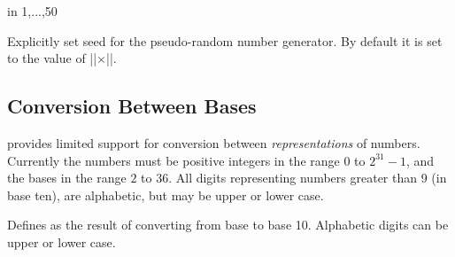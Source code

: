 \begin{codeexample}[]
\begin{pgfpicture}
   \foreach \a in {1,...,50}{
      \color{\c!40!white}
   }	  
\end{pgfpicture}
\end{codeexample}

\begin{command}{\pgfmathsetseed{}}
  Explicitly set seed for the pseudo-random number generator. By
  default it is set to the value of |\time|$\times$|\year|.
\end{command}


      
\subsection{Conversion Between Bases}
	
\label{pgfmath-bases}

\pgfname{} provides limited support for conversion between 
\emph{representations} of numbers. Currently the numbers must be
positive integers in the range $0$ to $2^{31}-1$, and the bases in the
range $2$ to $36$. All digits representing numbers greater than 9 (in
base ten), are alphabetic, but may be upper or lower case. 

\begin{command}{\pgfmathbasetodec{}}
	Defines  as the result of converting  from
	base  to base 10. Alphabetic digits can be upper or lower
	case.

\medskip

\end{command}

